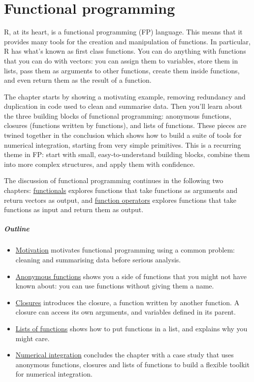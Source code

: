 \chapter{Functional programming}\label{functional-programming}

R, at its heart, is a functional programming (FP) language. This means
that it provides many tools for the creation and manipulation of
functions. In particular, R has what's known as first class functions.
You can do anything with functions that you can do with vectors: you can
assign them to variables, store them in lists, pass them as arguments to
other functions, create them inside functions, and even return them as
the result of a function. 

The chapter starts by showing a motivating example, removing redundancy
and duplication in code used to clean and summarise data. Then you'll
learn about the three building blocks of functional programming:
anonymous functions, closures (functions written by functions), and
lists of functions. These pieces are twined together in the conclusion
which shows how to build a suite of tools for numerical integration,
starting from very simple primitives. This is a recurring theme in FP:
start with small, easy-to-understand building blocks, combine them into
more complex structures, and apply them with confidence.

The discussion of functional programming continues in the following two
chapters: \hyperref[functionals]{functionals} explores functions that
take functions as arguments and return vectors as output, and
\hyperref[function-operators]{function operators} explores functions
that take functions as input and return them as output.

\paragraph{Outline}

\begin{itemize}
\item
  \hyperref[fp-motivation]{Motivation} motivates functional programming
  using a common problem: cleaning and summarising data before serious
  analysis.
\item
  \hyperref[anonymous-functions]{Anonymous functions} shows you a side
  of functions that you might not have known about: you can use
  functions without giving them a name.
\item
  \hyperref[closures]{Closures} introduces the closure, a function
  written by another function. A closure can access its own arguments,
  and variables defined in its parent.
\item
  \hyperref[lists-of-functions]{Lists of functions} shows how to put
  functions in a list, and explains why you might care.
\item
  \hyperref[numerical-integration]{Numerical integration} concludes the
  chapter with a case study that uses anonymous functions, closures and
  lists of functions to build a flexible toolkit for numerical
  integration.
\end{itemize}

